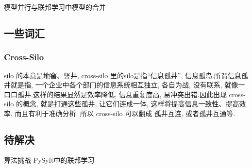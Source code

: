 \documentclass[a4paper]{article}
\begin{document}
模型并行与联邦学习中模型的合并

 


\subsection*{一些词汇}
\subsubsection*{ Cross-Silo} 
silo 的本意是地窖、竖井, cross-silo 里的silo是指“信息孤井”, 信息孤岛.所谓信息孤井就是指, 一个企业中各个部门的信息系统相互独立, 各自为战, 没有联系, 就像一口口孤井.这样的结果显然是效率降低, 信息重复度高, 易冲突出错.因此出现 cross-silo 的概念, 就是打通这些孤井, 让它们连成一体, 这样将提高信息一致性、提高效率, 而且有利于准确分析.
所以 cross-silo 可以翻成 孤井互连, 或者孤井互通等. 


\subsection{待解决}
算法挑战
PySyft中的联邦学习 



\end{document}
